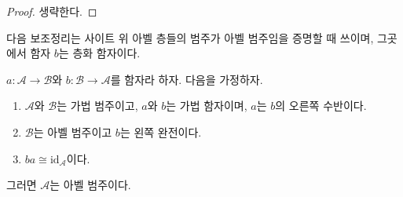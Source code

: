 \begin{proof}
생략한다.
\end{proof}

\noindent
다음 보조정리는 사이트 위 아벨 층들의 범주가 아벨 범주임을 증명할 때
쓰이며, 그곳에서 함자 $b$는 층화 함자이다.

\begin{lemma}
\label{lemma-adjoint-get-abelian}
$a : \mathcal{A} \to \mathcal{B}$와 $b : \mathcal{B} \to \mathcal{A}$를
함자라 하자. 다음을 가정하자.
\begin{enumerate}
\item $\mathcal{A}$와 $\mathcal{B}$는 가법 범주이고,
$a$와 $b$는 가법 함자이며, $a$는 $b$의 오른쪽 수반이다.
\item $\mathcal{B}$는 아벨 범주이고 $b$는 왼쪽 완전이다.
\item $ba \cong \text{id}_\mathcal{A}$이다.
\end{enumerate}
그러면 $\mathcal{A}$는 아벨 범주이다.
\end{lemma}

